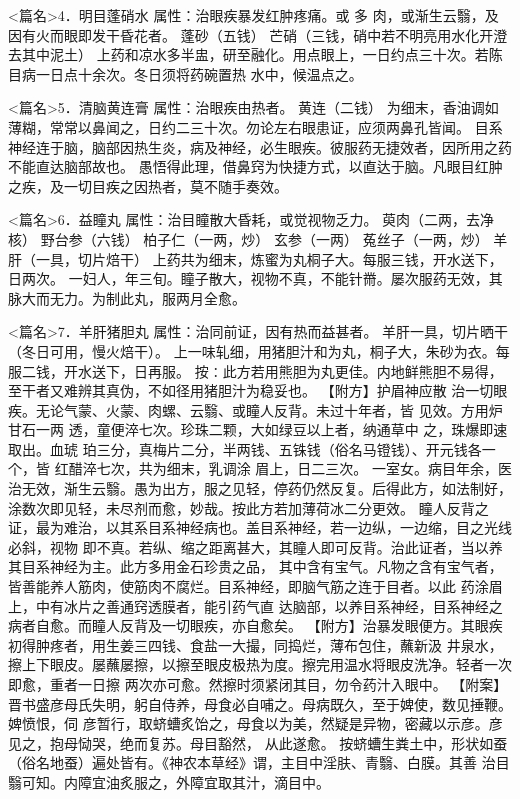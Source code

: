 \documentclass[a4paper,12pt,UTF8,twoside]{ctexbook}
\begin{document}
<篇名>4．明目蓬硝水
属性：治眼疾暴发红肿疼痛。或 多 肉，或渐生云翳，及因有火而眼即发干昏花者。 
蓬砂（五钱） 芒硝（三钱，硝中若不明亮用水化开澄去其中泥土） 
上药和凉水多半盅，研至融化。用点眼上，一日约点三十次。若陈目病一日点十余次。冬日须将药碗置热 
水中，候温点之。 


<篇名>5．清脑黄连膏
属性：治眼疾由热者。 
黄连（二钱） 为细末，香油调如薄糊，常常以鼻闻之，日约二三十次。勿论左右眼患证，应须两鼻孔皆闻。 
目系神经连于脑，脑部因热生炎，病及神经，必生眼疾。彼服药无捷效者，因所用之药不能直达脑部故也。 
愚悟得此理，借鼻窍为快捷方式，以直达于脑。凡眼目红肿之疾，及一切目疾之因热者，莫不随手奏效。 


<篇名>6．益瞳丸
属性：治目瞳散大昏耗，或觉视物乏力。 
萸肉（二两，去净核） 野台参（六钱） 柏子仁（一两，炒） 玄参（一两） 菟丝子（一两，炒） 
羊肝（一具，切片焙干） 
上药共为细末，炼蜜为丸桐子大。每服三钱，开水送下，日两次。 
一妇人，年三旬。瞳子散大，视物不真，不能针黹。屡次服药无效，其脉大而无力。为制此丸，服两月全愈。 


<篇名>7．羊肝猪胆丸
属性：治同前证，因有热而益甚者。 
羊肝一具，切片晒干（冬日可用，慢火焙干）。 
上一味轧细，用猪胆汁和为丸，桐子大，朱砂为衣。每服二钱，开水送下，日再服。 
按∶此方若用熊胆为丸更佳。内地鲜熊胆不易得，至干者又难辨其真伪，不如径用猪胆汁为稳妥也。 
【附方】护眉神应散 治一切眼疾。无论气蒙、火蒙、肉螺、云翳、或瞳人反背。未过十年者，皆 
见效。方用炉甘石一两 透，童便淬七次。珍珠二颗，大如绿豆以上者，纳通草中 之，珠爆即速取出。血琥 
珀三分，真梅片二分，半两钱、五铢钱（俗名马镫钱）、开元钱各一个，皆 红醋淬七次，共为细末，乳调涂 
眉上，日二三次。 
一室女。病目年余，医治无效，渐生云翳。愚为出方，服之见轻，停药仍然反复。后得此方，如法制好， 
涂数次即见轻，未尽剂而愈，妙哉。按此方若加薄荷冰二分更效。 
瞳人反背之证，最为难治，以其系目系神经病也。盖目系神经，若一边纵，一边缩，目之光线必斜，视物 
即不真。若纵、缩之距离甚大，其瞳人即可反背。治此证者，当以养其目系神经为主。此方多用金石珍贵之品， 
其中含有宝气。凡物之含有宝气者，皆善能养人筋肉，使筋肉不腐烂。目系神经，即脑气筋之连于目者。以此 
药涂眉上，中有冰片之善通窍透膜者，能引药气直 
达脑部，以养目系神经，目系神经之病者自愈。而瞳人反背及一切眼疾，亦自愈矣。 
【附方】治暴发眼便方。其眼疾初得肿疼者，用生姜三四钱、食盐一大撮，同捣烂，薄布包住，蘸新汲 
井泉水，擦上下眼皮。屡蘸屡擦，以擦至眼皮极热为度。擦完用温水将眼皮洗净。轻者一次即愈，重者一日擦 
两次亦可愈。然擦时须紧闭其目，勿令药汁入眼中。 
【附案】晋书盛彦母氏失明，躬自侍养，母食必自哺之。母病既久，至于婢使，数见捶鞭。婢愤恨，伺 
彦暂行，取蛴螬炙饴之，母食以为美，然疑是异物，密藏以示彦。彦见之，抱母恸哭，绝而复苏。母目豁然， 
从此遂愈。 
按蛴螬生粪土中，形状如蚕（俗名地蚕）遍处皆有。《神农本草经》谓，主目中淫肤、青翳、白膜。其善 
治目翳可知。内障宜油炙服之，外障宜取其汁，滴目中。 
\end{document}
